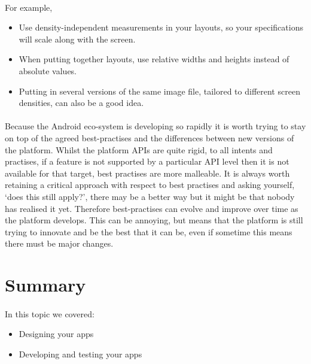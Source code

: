 \paragraph{} For example,

\begin{itemize}
\item Use density-independent measurements in your layouts, so your specifications will scale along with the screen.
\item When putting together layouts, use relative widths and heights instead of absolute values.
\item Putting in several versions of the same image file, tailored to different screen densities, can also be a good idea.
\end{itemize}

\paragraph{} Because the Android eco-system is developing so rapidly it is worth trying to stay on top of the agreed best-practises and the differences between new versions of the platform. Whilst the platform APIs are quite rigid, to all intents and practises, if a feature is not supported by a particular API level then it is not available for that target, best practises are more malleable. It is always worth retaining a critical approach with respect to best practises and asking yourself, `does this still apply?', there may be a better way but it might be that nobody has realised it yet. Therefore best-practises can evolve and improve over time as the platform develops. This can be annoying, but means that the platform is still trying to innovate and be the best that it can be, even if sometime this means there must be major changes.

\section{Summary}
\paragraph{}

\paragraph{} In this topic we covered: 
\begin{itemize}
\item Designing your apps
\item Developing and testing your apps
\end{itemize}

